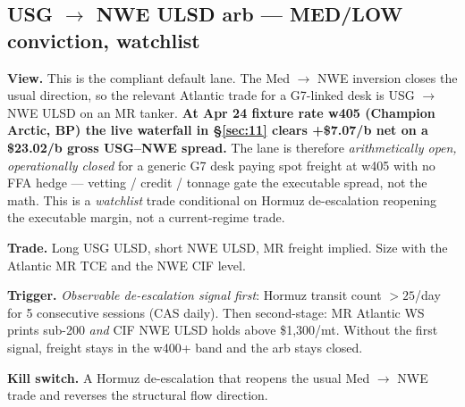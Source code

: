 \documentclass[10pt,a4paper]{article}
\begin{document}
\subsection{USG $\rightarrow$ \mbox{NWE} ULSD arb --- MED/LOW conviction, watchlist}

\textbf{View.} This is the compliant default lane. The Med $\rightarrow$ \mbox{NWE} inversion closes the usual direction, so the relevant Atlantic trade for a G7-linked desk is USG $\rightarrow$ \mbox{NWE} ULSD on an MR tanker. \textbf{At Apr 24 fixture rate w405 (Champion Arctic, BP) the live waterfall in \S\ref{sec:11} clears \textbf{+\$7.07/b net} on a \$23.02/b gross USG--NWE spread.} The lane is therefore \emph{arithmetically open, operationally closed} for a generic G7 desk paying spot freight at w405 with no FFA hedge --- vetting / credit / tonnage gate the executable spread, not the math. This is a \emph{watchlist} trade conditional on Hormuz de-escalation reopening the executable margin, not a current-regime trade.

\textbf{Trade.} Long USG ULSD, short \mbox{NWE} ULSD, MR freight implied. Size with the Atlantic MR TCE and the \mbox{NWE} CIF level.

\textbf{Trigger.} \emph{Observable de-escalation signal first}: Hormuz transit count $>25$/day for 5 consecutive sessions (CAS daily). Then second-stage: MR Atlantic WS prints sub-200 \emph{and} CIF \mbox{NWE} ULSD holds above \$1,300/mt. Without the first signal, freight stays in the w400+ band and the arb stays closed.

\textbf{Kill switch.} A Hormuz de-escalation that reopens the usual Med $\rightarrow$ \mbox{NWE} trade and reverses the structural flow direction.
\end{document}
